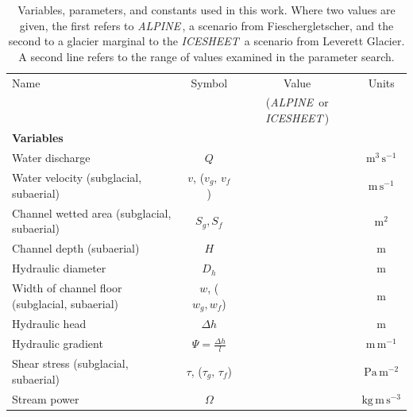 \documentclass[tc, manuscript]{copernicus}
\newcommand{\alpine}{\textit{ALPINE}\,}
\newcommand{\icesheet}{\textit{ICESHEET}\,}
\begin{document}
\begin{table}[hbt!]
  \centering
  \caption{Variables, parameters, and constants used in this work.
    Where two values are given, the first refers to  \alpine{}, a scenario from Fieschergletscher, and the second to a glacier marginal to the \icesheet{} a scenario from Leverett Glacier.
    A second line refers to the range of values examined in the parameter search.}
  \small 
  \begin{tabular}{ l  c  c c }
    Name &Symbol&  Value&Units \\
         && (\alpine{} or \icesheet{})\\
    \hline
    \textbf{Variables}  & & & \\
    Water discharge  & $Q$& & $\mathrm{m^{3}\,s^{-1}}$ \\
    Water velocity (subglacial, subaerial)  & $v$, ($v_g,\,v_{f}$)& & $\mathrm{m\,s^{-1}}$ \\
    Channel wetted area (subglacial, subaerial) &  $S_g, S_f$& & $\mathrm{m^2}$     \\
    Channel depth (subaerial) & $H$&& $\mathrm{m}$\\
    Hydraulic diameter &$D_h$&&$\mathrm{m}$\\
    Width of channel floor (subglacial, subaerial) & $w$, ($w_g,w_f$)&  & $\mathrm{m}$     \\
    Hydraulic head &$\Delta h$&& $\mathrm{m}$\\
    Hydraulic gradient &$\Psi=\frac{\Delta h}{l}$&& $\mathrm{m\, m^{-1}}$\\
    Shear stress (subglacial, subaerial) & $\tau$, ($\tau_g,\,\tau_f$) && $\mathrm{Pa \, m^{-2}}$ \\
    Stream power & $\Omega$ && $\mathrm{ kg \, m\, s^{-3}}$ \\



\end{tabular}
\end{table}
\end{document}
